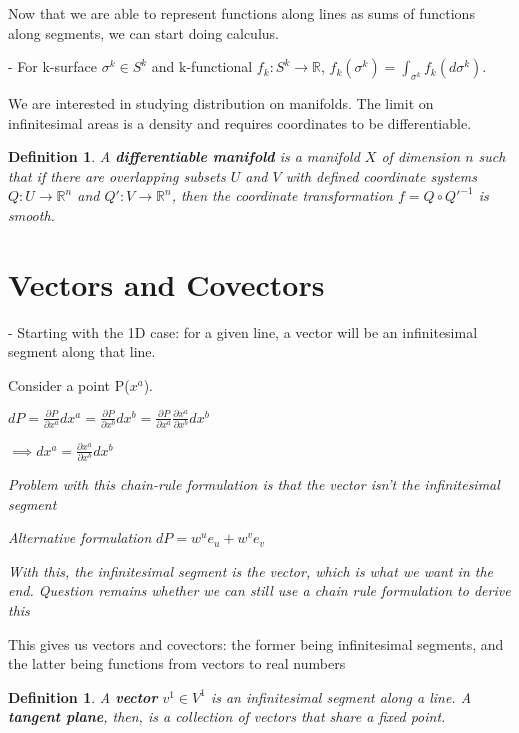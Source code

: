 \documentclass{book}
\newtheorem{defn}[equation]{Definition}
\begin{document}
Now that we are able to represent functions along lines as sums of functions along segments, we can start doing calculus. 


- For k-surface $\sigma^k \in S^k$ and k-functional $f_k: S^k \to \mathbb{R}$, $f_k(\sigma^k) = \int_{\sigma^k}f_k(d\sigma^k)$. 

We are interested in studying distribution on manifolds. The limit on infinitesimal areas is a density and requires coordinates to be differentiable.


\begin{defn}
	A \textbf{differentiable manifold} is a manifold $X$ of dimension $n$ such that if there are overlapping subsets $U$ and $V$ with defined coordinate systems $Q: U \to \mathbb{R}^n$ and $Q': V \to \mathbb{R}^n$, then the coordinate transformation $f = Q \circ Q'^{-1}$ is smooth. 
\end{defn}





\section{Vectors and Covectors}

- Starting with the 1D case: for a given line, a vector will be an infinitesimal segment along that line. 


Consider a point P($x^a$).
 
$dP = \frac{\partial P}{\partial x^a} dx^a = \frac{\partial P}{\partial x^b} dx^b = \frac{\partial P}{\partial x^a}\frac{\partial x^a}{\partial x^b} dx^b$

$\implies dx^a = \frac{\partial x^a}{\partial x^b}dx^b $

\emph{Problem with this chain-rule formulation is that the vector isn't the infinitesimal segment}

\emph{Alternative formulation}
$dP = w^ue_u + w^ve_v$

\emph{With this, the infinitesimal segment is the vector, which is what we want in the end. Question remains whether we can still use a chain rule formulation to derive this}

This gives us vectors and covectors: the former being infinitesimal segments, and the latter being functions from vectors to real numbers



\begin{defn}
	A \textbf{vector} $v^1 \in V^1$ is an infinitesimal segment along a line. A \textbf{tangent plane}, then, is a collection of vectors that share a fixed point. 
\end{defn}
\end{document}

